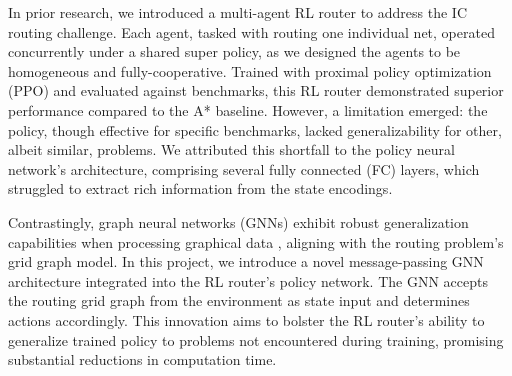 \documentclass[letterpaper]{article}
\begin{document}
In prior research, we introduced a multi-agent RL router to address the IC routing challenge. Each agent, tasked with routing one individual net, operated concurrently under a shared super policy, as we designed the agents to be homogeneous and fully-cooperative. Trained with proximal policy optimization (PPO) \cite{Schulman2017} and evaluated against benchmarks, this RL router demonstrated superior performance compared to the A* baseline. However, a limitation emerged: the policy, though effective for specific benchmarks, lacked generalizability for other, albeit similar, problems. We attributed this shortfall to the policy neural network's architecture, comprising several fully connected (FC) layers, which struggled to extract rich information from the state encodings.

Contrastingly, graph neural networks (GNNs) exhibit robust generalization capabilities when processing graphical data \cite{Almasan2022,Wang2018}, aligning with the routing problem’s grid graph model. In this project, we introduce a novel message-passing GNN architecture integrated into the RL router’s policy network. The GNN accepts the routing grid graph from the environment as state input and determines actions accordingly. This innovation aims to bolster the RL router’s ability to generalize trained policy to problems not encountered during training, promising substantial reductions in computation time.




\end{document}
